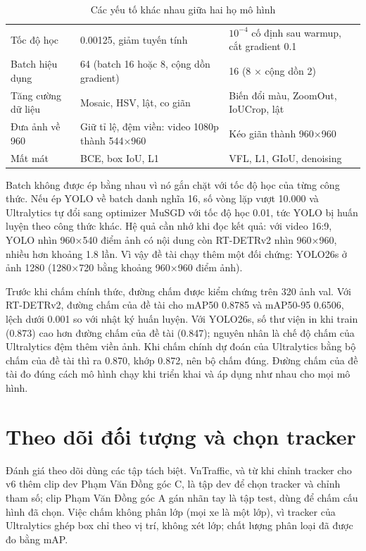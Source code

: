 \begin{table}[H]
  \centering
  \caption{Các yếu tố khác nhau giữa hai họ mô hình}
  \label{tab:khong-dong-nhat}
  \small
  \begin{tabularx}{\linewidth}{P{2.8cm}LL}
    \toprule
     &  &  \\ \midrule
    Tốc độ học & 0.00125, giảm tuyến tính & $10^{-4}$ cố định sau warmup, cắt gradient 0.1 \\ \rowsep
    Batch hiệu dụng & 64 (batch 16 hoặc 8, cộng dồn gradient) & 16 (8 × cộng dồn 2) \\ \rowsep
    Tăng cường dữ liệu & Mosaic, HSV, lật, co giãn & Biến đổi màu, ZoomOut, IoUCrop, lật \\ \rowsep
    Đưa ảnh về 960 & Giữ tỉ lệ, đệm viền: video 1080p thành 544×960 & Kéo giãn thành 960×960 \\ \rowsep
    Mất mát & BCE, box IoU, L1 & VFL, L1, GIoU, denoising \\ \bottomrule
  \end{tabularx}
\end{table}

Batch không được ép bằng nhau vì nó gắn chặt với tốc độ học của từng công thức. Nếu ép YOLO về batch danh nghĩa 16, số
vòng lặp vượt 10.000 và Ultralytics tự đổi sang optimizer MuSGD với tốc độ học 0.01, tức YOLO bị huấn luyện theo công
thức khác. Hệ quả cần nhớ khi đọc kết quả: với video 16:9, YOLO nhìn 960×540 điểm ảnh có nội dung còn RT-DETRv2 nhìn
960×960, nhiều hơn khoảng 1.8 lần. Vì vậy đề tài chạy thêm một đối chứng: YOLO26s ở ảnh 1280 (1280×720 bằng khoảng
960×960 điểm ảnh).

Trước khi chấm chính thức, đường chấm được kiểm chứng trên 320 ảnh val. Với RT-DETRv2, đường chấm của đề tài cho mAP50
0.8785 và mAP50-95 0.6506, lệch dưới 0.001 so với nhật ký huấn luyện. Với YOLO26s, số thư viện in khi train (0.873)
cao hơn đường chấm của đề tài (0.847); nguyên nhân là chế độ chấm của Ultralytics đệm thêm viền ảnh. Khi chấm chính dự
đoán của Ultralytics bằng bộ chấm của đề tài thì ra 0.870, khớp 0.872, nên bộ chấm đúng. Đường chấm của đề tài đo đúng
cách mô hình chạy khi triển khai và áp dụng như nhau cho mọi mô hình.

\section{Theo dõi đối tượng và chọn tracker}
\label{sec:chon-tracker}

Đánh giá theo dõi dùng các tập tách biệt. VnTraffic, và từ khi chỉnh tracker cho v6 thêm clip dev Phạm Văn Đồng góc C,
là tập dev để chọn tracker và chỉnh tham số; clip Phạm Văn Đồng góc A gán nhãn tay là tập test, dùng để chấm cấu hình
đã chọn. Việc chấm không phân lớp (mọi xe là một lớp), vì tracker của
Ultralytics ghép box chỉ theo vị trí, không xét lớp; chất lượng phân loại đã được đo bằng mAP.

